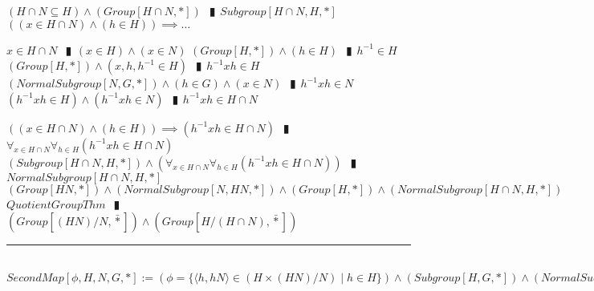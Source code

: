 \documentclass{book}
\newcommand{\abr}{:=}
\newcommand{\pipe}{$\phantom{(}\vrectangleblack\phantom{)}$}
\newcommand{\bbin}[1]{\mathbin{{\bar{#1}}}}
\newcommand{\st}{\mathbin{|}}
\begin{document}
\begin{enumerate}
  \lit $(H \cap N \subseteq H) \land (Group[H \cap N, *])$ \pipe $Subgroup[H \cap N, H, *]$
  \lit $((x \in H \cap N) \land (h \in H)) \implies \ldots$
  \begin{enumerate}
    \lit $x \in H \cap N$ \pipe $(x \in H) \land (x \in N)$
    \lit $(Group[H, *]) \land (h \in H)$ \pipe $h^{-1} \in H$
    \lit $(Group[H, *]) \land (x, h, h^{-1} \in H)$ \pipe $h^{-1} x h \in H$
    \lit $(NormalSubgroup[N, G, *]) \land (h \in G) \land (x \in N)$ \pipe $h^{-1} x h \in N$
    \lit $(h^{-1} x h \in H) \land (h^{-1} x h \in N)$ \pipe $h^{-1} x h \in H \cap N$
  \end{enumerate}
  \lit $((x \in H \cap N) \land (h \in H)) \implies (h^{-1} x h \in H \cap N)$ \pipe $\forall_{x \in H \cap N} \forall_{h \in H}(h^{-1} x h \in H \cap N)$
  \lit $(Subgroup[H \cap N, H, *]) \land (\forall_{x \in H \cap N} \forall_{h \in H}(h^{-1} x h \in H \cap N))$ \pipe $NormalSubgroup[H \cap N, H, *]$
  \lit $(Group[H N, *]) \land (NormalSubgroup[N, H N, *]) \land (Group[H, *]) \land (NormalSubgroup[H \cap N, H, *])$
  \lit $QuotientGroupThm$ \pipe $(Group[(H N) / N, \bbin{*}]) \land (Group[H / (H \cap N), \bbin{*}])$
\end{enumerate} \vspace{.75mm} \hrule \vspace{.75mm} \ \\ 

$SecondMap[\phi, H, N, G, *] \abr (\phi = \{\langle h, h N \rangle \in (H \times (H N) / N) \st h \in H\}) \land (Subgroup[H, G, *]) \land (NormalSubgroup[N, G, *])$ \\
\end{document}
